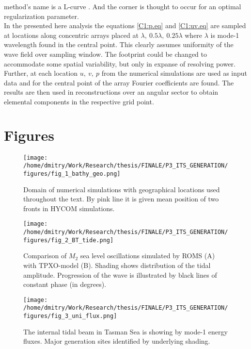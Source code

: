 \documentclass[12pt]{article}
\newcommand{\SCALET}{1.5}
\begin{document}
method's name is a L-curve \citep{hansen1999curve}. And the corner is thought to occur for an 
optimal regularization parameter.\\
In the presented here analysis the equations \eqref{C1:p.eq} and \eqref{C1:uv.eq} are sampled at locations along concentric 
arrays placed at $\lambda,~0.5\lambda,~0.25\lambda$ where $\lambda$ is mode-1 wavelength found in 
the central point. This clearly assumes uniformity of the wave field over sampling window. The 
footprint could be changed to accommodate some spatial variability, but only in expanse of 
resolving power. Further, at each location $u,~v,~p$ from the numerical simulations are used as 
input data and for the central point of the array Fourier coefficients are found. The results are 
then used in reconstructions over an angular sector to obtain elemental components in the 
respective grid point.

\newpage
\section{Figures}

\begin{figure}
	\centering
	\texttt{[image: /home/dmitry/Work/Research/thesis/FINALE/P3\_ITS\_GENERATION/figures/fig\_1\_bathy\_geo.png]}
	\caption{Domain of numerical simulations with geographical locations used throughout the text. 
	By pink line it is given mean position of two fronts in HYCOM simulations.}
	\label{C3:fig:geo.map}
\end{figure}

\begin{figure}
	\centering
	\texttt{[image: /home/dmitry/Work/Research/thesis/FINALE/P3\_ITS\_GENERATION/figures/fig\_2\_BT\_tide.png]}
	\caption{Comparison of $M_2$ sea level oscillations simulated by ROMS (A) with 
	TPXO-model (B). Shading shows distribution of the tidal amplitude. Progression of the wave is 
	illustrated by black lines of constant phase (in degrees).}
	\label{C3.fig:BT}
\end{figure}

\begin{figure}
	\centering
	\texttt{[image: /home/dmitry/Work/Research/thesis/FINALE/P3\_ITS\_GENERATION/figures/fig\_3\_uni\_flux.png]}
	\caption{The internal tidal beam in Tasman Sea is showing by mode-1 energy fluxes. Major 
	generation sites identified by underlying shading.}
	\label{C3.fig:beam}
\end{figure}
\end{document}
